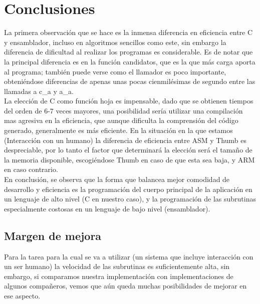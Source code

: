 \documentclass[12pt,letterpaper]{article}
\begin{document}
\section{Conclusiones}

La primera observación que se hace es la inmensa diferencia en
eficiencia entre C y ensamblador, incluso en algoritmos sencillos como
este, sin embargo la diferencia de dificultad al realizar los
programas es considerable. Es de notar que la principal diferencia es
en la función candidatos, que es la que más carga aporta al programa;
también puede verse como el llamador es poco importante, obteniéndose
diferencias de apenas unas pocas cienmilésimas de segundo entre las
llamadas a c\_a y a\_a.\\
La elección de C como función hoja es impensable, dado que se obtienen
tiempos del orden de 6-7 veces mayores, una posibilidad sería utilizar
una compilación mas agresiva en la eficiencia, que aunque dificulta la
comprensión del código generado, generalmente es más eficiente. En la
situación en la que estamos (Interacción con un humano) la diferencia
de eficiencia entre ASM y Thumb es despreciable, por lo tanto el
factor que determinará la elección será el tamaño de la memoria
disponible, escogiéndose Thumb en caso de que esta sea baja, y ARM en
caso contrario.\\
En conclusión, se observa que la forma que balancea mejor comodidad de
desarrollo y eficiencia es la programación del cuerpo principal de la
aplicación en un lenguaje de alto nivel (C en nuestro caso), y la
programación de las subrutinas especialmente costosas en un lenguaje
de bajo nivel (ensamblador).

\subsection{Margen de mejora}
Para la tarea para la cual se va a utilizar (un sistema que incluye
interacción con un ser humano) la velocidad de las subrutinas es
suficientemente alta, sin embargo, si comparamos nuestra
implementación con implementaciones de algunos compañeros, vemos que
aún queda muchas posibilidades de mejorar en ese aspecto.
\clearpage
\end{document}
